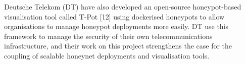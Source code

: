 	Deutsche Telekom (DT) have also developed an open-source honeypot-based visualisation tool called T-Pot [12] using dockerised honeypots to allow organisations to manage honeypot deployments more easily. DT use this framework to manage the security of their own telecommunications infrastructure, and their work on this project strengthens the case for the coupling of scalable honeynet deployments and visualisation tools.  

